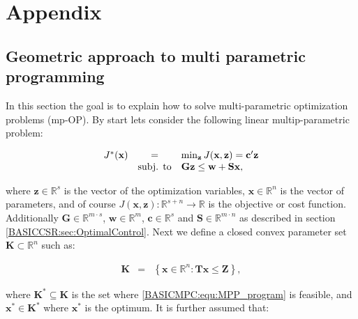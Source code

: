 \chapter*{Appendix}

\section{Geometric approach to multi parametric programming}\label{BASICCSR:sec:MPP}

    In this section the goal is to explain how to solve multi-parametric optimization problems (mp-OP). By start lets consider the following linear multip-parametric problem:

        \begin{equation}
    \begin{array}{rcl}
            J^*(\textbf{x})&=&\min_{\textbf{z}}J(\textbf{x},\textbf{z})=\textbf{c}'\textbf{z}\\
            &\textnormal{subj. to}&\textbf{Gz}\leq\textbf{w}+\textbf{Sx},
        \end{array}
        \label{BASICMPC:equ:MPP_program}
    \end{equation}

    where $\textbf{z}\in\mathbb{R}^s$ is the vector of the optimization variables,  $\textbf{x}\in\mathbb{R}^n$ is the vector of parameters, and of course $J(\textbf{x},\textbf{z}):\mathbb{R}^{s+n}\rightarrow\mathbb{R}$ is the objective or cost function. Additionally $\textbf{G}\in\mathbb{R}^{m\cdot s}$, $\textbf{w}\in\mathbb{R}^m$, $\textbf{c}\in\mathbb{R}^s$ and $\textbf{S}\in\mathbb{R}^{m\cdot n}$ as described in section \ref{BASICCSR:sec:OptimalControl}. Next we define a closed convex parameter set $\textbf{K}\subset\mathbb{R}^n$ such as:

    \begin{equation}
    \begin{array}{rcl}
            \textbf{K}&=&\left\{ \textbf{x}\in\mathbb{R}^n:\textbf{Tx}\leq\textbf{Z}\right\},
        \end{array}
        \label{BASICMPC:equ:MPP_parameterset}
    \end{equation}

    where $\textbf{K}^*\subseteq\textbf{K}$ is the set where \ref{BASICMPC:equ:MPP_program} is feasible, and $\textbf{x}^*\in\textbf{K}^*$ where $\textbf{x}^*$ is the optimum. It is further assumed that:

